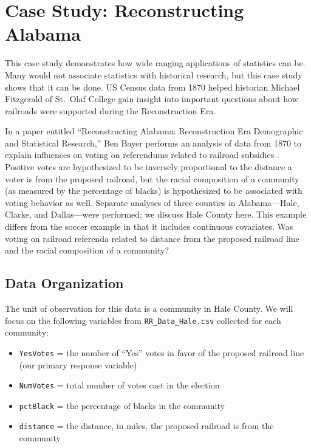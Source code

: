 \documentclass[
]{krantz}
\begin{document}
\hypertarget{case-study-reconstructing-alabama}{%
\section{Case Study: Reconstructing Alabama}\label{case-study-reconstructing-alabama}}

This case study demonstrates how wide ranging applications of statistics can be. Many would not associate statistics with historical research, but this case study shows that it can be done. US Census data from 1870 helped historian Michael Fitzgerald of St.~Olaf College gain insight into important questions about how railroads were supported during the Reconstruction Era.

In a paper entitled ``Reconstructing Alabama: Reconstruction Era Demographic and Statistical Research,'' Ben Bayer performs an analysis of data from 1870 to explain influences on voting on referendums related to railroad subsidies \citep{Bayer2011}. Positive votes are hypothesized to be inversely proportional to the distance a voter is from the proposed railroad, but the racial composition of a community (as measured by the percentage of blacks) is hypothesized to be associated with voting behavior as well. Separate analyses of three counties in Alabama---Hale, Clarke, and Dallas---were performed; we discuss Hale County here. This example differs from the soccer example in that it includes continuous covariates. Was voting on railroad referenda related to distance from the proposed railroad line and the racial composition of a community?

\hypertarget{data-organization-3}{%
\subsection{Data Organization}\label{data-organization-3}}

The unit of observation for this data is a community in Hale County. We will focus on the following variables from \texttt{RR\_Data\_Hale.csv} collected for each community:

\begin{itemize}
\item
  \texttt{YesVotes} = the number of ``Yes'' votes in favor of the proposed railroad line (our primary response variable)
\item
  \texttt{NumVotes} = total number of votes cast in the election
\item
  \texttt{pctBlack} = the percentage of blacks in the community
\item
  \texttt{distance} = the distance, in miles, the proposed railroad is from the community
\end{itemize}
\end{document}
